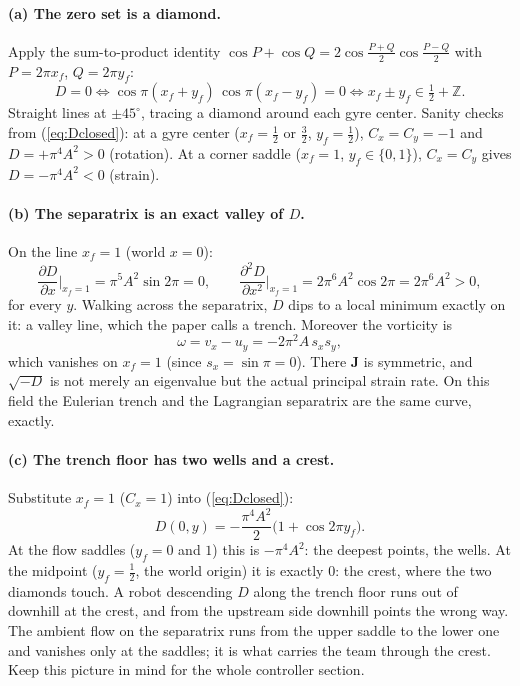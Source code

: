 \documentclass[11pt]{article}
\begin{document}
\paragraph{(a) The zero set is a diamond.}
Apply the sum-to-product identity
$\cos P + \cos Q = 2\cos\frac{P+Q}{2}\cos\frac{P-Q}{2}$ with $P = 2\pi x_f$,
$Q = 2\pi y_f$:
\begin{equation}
D = 0
\iff \cos\pi(x_f + y_f)\,\cos\pi(x_f - y_f) = 0
\iff x_f \pm y_f \in \tfrac{1}{2} + \mathbb{Z}.
\end{equation}
Straight lines at $\pm 45^\circ$, tracing a diamond around each gyre center.
Sanity checks from (\ref{eq:Dclosed}): at a gyre center
($x_f = \tfrac12$ or $\tfrac32$, $y_f = \tfrac12$), $C_x = C_y = -1$ and
$D = +\pi^4A^2 > 0$ (rotation). At a corner saddle ($x_f = 1$, $y_f \in
\{0,1\}$), $C_x = C_y$ gives $D = -\pi^4A^2 < 0$ (strain).

\paragraph{(b) The separatrix is an exact valley of $D$.}
On the line $x_f = 1$ (world $x = 0$):
\begin{equation}
\frac{\partial D}{\partial x}\Big|_{x_f=1} = \pi^5A^2 \sin 2\pi = 0,
\qquad
\frac{\partial^2 D}{\partial x^2}\Big|_{x_f=1} = 2\pi^6A^2 \cos 2\pi
 = 2\pi^6A^2 > 0,
\end{equation}
for every $y$. Walking across the separatrix, $D$ dips to a local minimum
exactly on it: a valley line, which the paper calls a trench. Moreover the
vorticity is
\begin{equation}
\omega = v_x - u_y = -2\pi^2 A\, s_x s_y,
\end{equation}
which vanishes on $x_f = 1$ (since $s_x = \sin\pi = 0$). There $\mathbf{J}$
is symmetric, and $\sqrt{-D}$ is not merely an eigenvalue but the actual
principal strain rate. On this field the Eulerian trench and the Lagrangian
separatrix are the same curve, exactly.

\paragraph{(c) The trench floor has two wells and a crest.}
Substitute $x_f = 1$ ($C_x = 1$) into (\ref{eq:Dclosed}):
\begin{equation}
D(0, y) = -\frac{\pi^4A^2}{2}\bigl(1 + \cos 2\pi y_f\bigr).
\end{equation}
At the flow saddles ($y_f = 0$ and $1$) this is $-\pi^4A^2$: the deepest
points, the wells. At the midpoint ($y_f = \tfrac12$, the world origin) it
is exactly $0$: the crest, where the two diamonds touch. A robot descending
$D$ along the trench floor runs out of downhill at the crest, and from the
upstream side downhill points the wrong way. The ambient flow on the
separatrix runs from the upper saddle to the lower one and vanishes only at
the saddles; it is what carries the team through the crest. Keep this
picture in mind for the whole controller section.
\end{document}
